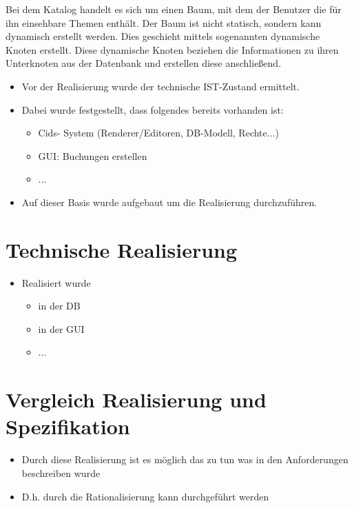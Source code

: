 Bei dem Katalog handelt es sich um einen Baum, mit dem der Benutzer die für ihn einsehbare Themen enthält. Der Baum ist nicht statisch, sondern kann dynamisch erstellt werden. Dies geschieht mittels sogenannten dynamische Knoten erstellt. Diese dynamische Knoten beziehen die Informationen zu ihren Unterknoten aus der Datenbank und erstellen diese anschließend.




\begin{itemize}
	\item Vor der Realisierung wurde der technische IST-Zustand ermittelt.
	\item Dabei wurde festgestellt, dass folgendes bereits vorhanden ist:
	\begin{itemize}
		\item Cids- System (Renderer/Editoren, DB-Modell, Rechte...)
		\item GUI: Buchungen erstellen
		\item ...
	\end{itemize}
	\item Auf dieser Basis wurde aufgebaut um die Realisierung durchzuführen.
\end{itemize}

\section{Technische Realisierung}
\begin{itemize}
	\item Realisiert wurde
	\begin{itemize}
		\item in der DB
		\item in der GUI
		\item ...
	\end{itemize}
\end{itemize}


\section{Vergleich Realisierung und Spezifikation}
\begin{itemize}
	\item Durch diese Realisierung ist es möglich das zu tun was in den Anforderungen beschreiben wurde
	\item D.h. durch die Rationalisierung kann durchgeführt werden
\end{itemize}